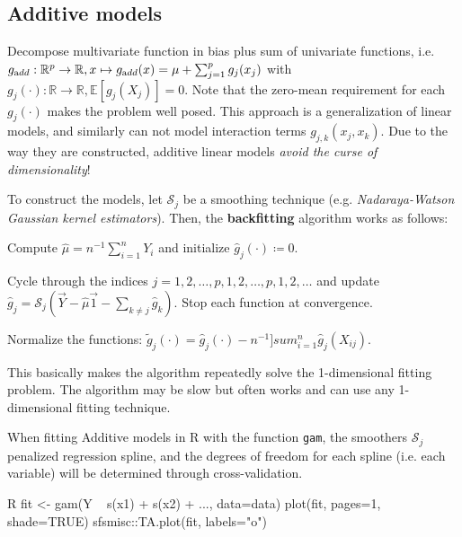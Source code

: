 \subsection{Additive models}%
\label{sub:additive_models}
\begin{sectionbox}\nospacing{}
  Decompose multivariate function in bias plus sum of univariate functions, i.e. $g_{\textrm add}: \mathbb{R}^p\to\mathbb{R}, x\mapsto g_{\textrm add}(x) = \mu + \sum_{j=1}^pg_j(x_j)$ with $g_j(\cdot): \mathbb{R}\to\mathbb{R}, \mathbb{E}[g_j(X_j)]=0$.
  Note that the zero-mean requirement for each $g_j(\cdot)$ makes the problem well posed.
  This approach is a generalization of linear models, and similarly can not model interaction terms $g_{j,k}(x_j, x_k)$.
  Due to the way they are constructed, additive linear models \emph{avoid the curse of dimensionality}!
\end{sectionbox}
\begin{sectionbox}\nospacing{}
  To construct the models, let $\mathcal{S}_j$ be a smoothing technique (e.g. \emph{Nadaraya-Watson Gaussian kernel estimators}).
  Then, the \textbf{backfitting} algorithm works as follows:
  \begin{itemizenosep}
    \item Compute $\hat \mu = n^{-1}\sum_{i=1}^n Y_i$ and initialize $\hat g_j(\cdot) \coloneqq 0$.
    \item Cycle through the indices $j = 1,2,\dots,p,1,2,\dots,p,1,2,\dots$ and update
      $\hat g_j=\mathcal{S}_j(\vec{Y}-\hat \mu\vec{1}-\sum_{k\neq j}\hat g_k)$.
      Stop each function at convergence.
    \item Normalize the functions: $\tilde g_j(\cdot) = \hat g_j(\cdot) - n^{-1}]sum_{i=1}^n\hat g_j(X_{ij})$.
  \end{itemizenosep}
  This basically makes the algorithm repeatedly solve the 1-dimensional fitting problem.
  The algorithm may be slow but often works and can use any 1-dimensional fitting technique.
\end{sectionbox}
\begin{sectionbox}\nospacing{}
  When fitting Additive models in R with the function \verb!gam!, the smoothers $\mathcal{S}_j$ penalized regression spline, and the degrees of freedom for each spline (i.e. each variable) will be determined through cross-validation.

  \begin{mintlinebox}{R}
    fit <- gam(Y ~ s(x1) + s(x2) + ..., data=data)
    plot(fit, pages=1, shade=TRUE)
    sfsmisc::TA.plot(fit, labels="o")
  \end{mintlinebox}
\end{sectionbox}

